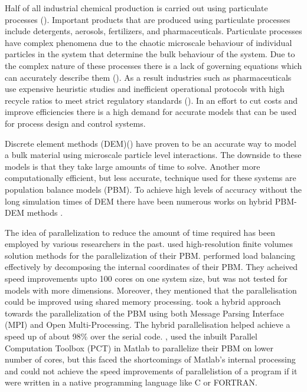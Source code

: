 \documentclass[preprint,11pt,authoryear]{elsarticle}
\begin{document}
	\par Half of all industrial chemical production is carried out using particulate processes (\cite{seville1997}). Important products that are produced using particulate processes include detergents, aerosols, fertilizers, and pharmaceuticals. Particulate processes have complex phenomena due to the chaotic microscale behaviour of individual particles in the system that determine the bulk behaviour of the system. Due to the complex nature of these processes there is a lack of governing equations which can accurately describe them (\cite{sen2013}). As a result industries such as pharmaceuticals use expensive heuristic studies and inefficient operational protocols with high recycle ratios to meet strict regulatory standards (\cite{Ramachandran2009}). In an effort to cut costs and improve efficiencies there is a high demand for accurate models that can be used for process design and control systems.   
	\par Discrete element methods (DEM)(\cite{Cundall1979}) have proven to be an accurate way to model a bulk material using microscale particle level interactions. The downside to these models is that they take large amounts of time to solve. Another more computationally efficient, but less accurate, technique used for these systems are population balance models (PBM). To achieve high levels of accuracy without the long simulation times of DEM there have been numerous works on hybrid PBM-DEM methods \citep{Barrasso2015cerd}.
	\par  The idea of parallelization to reduce the amount of time required has been employed by various researchers in the past. \cite{Gunawan2008} used high-resolution finite volumes solution methods for the parallelization of their PBM. \cite{Gunawan2008} performed load balancing effectively by decomposing the internal coordinates of their PBM. They acheived speed improvements upto 100 cores on one system size, but was not tested for models with more dimensions. Moreover, they mentioned that the parallelisation could be improved using shared memory processing. \cite{Bettencourt2017} took a hybrid approach towards the parallelization of the PBM using both Message Parsing Interface (MPI) and Open Multi-Processing. The hybrid parallelisation helped achieve a speed up of about 98\% over the serial code. \cite{Prakash2013a},\cite{Prakash2013b} used the inbuilt Parallel Computation Toolbox (PCT) in Matlab to parallelize their PBM on lower number of cores, but this faced the shortcomings of Matlab's internal processing and could not achieve the speed improvements of parallelistion of a program if it were written in a native programming language like C or FORTRAN. 
\end{document}
